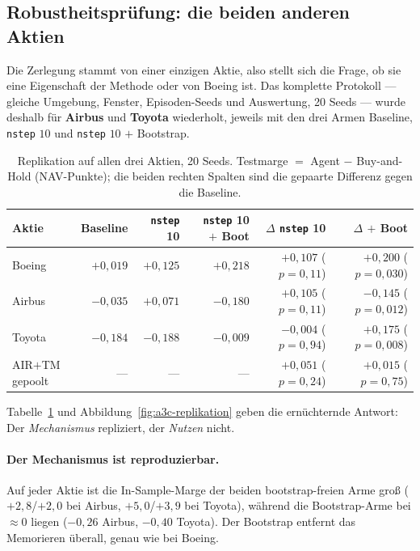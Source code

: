 \subsection{Robustheitsprüfung: die beiden anderen Aktien}
\label{sec:a3c-replikation}

Die Zerlegung stammt von einer einzigen Aktie, also stellt sich die Frage, ob sie eine
Eigenschaft der Methode oder von Boeing ist. Das komplette Protokoll --- gleiche Umgebung,
Fenster, Episoden-Seeds und Auswertung, 20 Seeds --- wurde deshalb für \textbf{Airbus} und
\textbf{Toyota} wiederholt, jeweils mit den drei Armen Baseline, \texttt{nstep} $10$ und
\texttt{nstep} $10$ $+$ Bootstrap.

\begin{table}[H]
  \centering
  \caption{Replikation auf allen drei Aktien, 20 Seeds. Testmarge $=$ Agent $-$ Buy-and-Hold
           (NAV-Punkte); die beiden rechten Spalten sind die gepaarte Differenz gegen die
           Baseline.}
  \label{tab:a3c-replikation}
  \small
  \begin{tabular}{lrrrrr}
    \toprule
    Aktie & Baseline & \texttt{nstep} 10 & \texttt{nstep} 10 $+$ Boot & $\Delta$ \texttt{nstep} 10 & $\Delta$ $+$ Boot\\
    \midrule
    Boeing & $+0{,}019$ & $+0{,}125$ & $+0{,}218$ & $+0{,}107$ ($p=0{,}11$)  & $+0{,}200$ ($p=0{,}030$)\\
    Airbus & $-0{,}035$ & $+0{,}071$ & $-0{,}180$ & $+0{,}105$ ($p=0{,}11$)  & $-0{,}145$ ($p=0{,}012$)\\
    Toyota & $-0{,}184$ & $-0{,}188$ & $-0{,}009$ & $-0{,}004$ ($p=0{,}94$)  & $+0{,}175$ ($p=0{,}008$)\\
    \midrule
    AIR$+$TM gepoolt & --- & --- & --- & $+0{,}051$ ($p=0{,}24$) & $+0{,}015$ ($p=0{,}75$)\\
    \bottomrule
  \end{tabular}
\end{table}

Tabelle~\ref{tab:a3c-replikation} und Abbildung~\ref{fig:a3c-replikation} geben die
ernüchternde Antwort: Der \emph{Mechanismus} repliziert, der \emph{Nutzen} nicht.

\paragraph{Der Mechanismus ist reproduzierbar.} Auf jeder Aktie ist die In-Sample-Marge der
beiden bootstrap-freien Arme groß ($+2{,}8$/$+2{,}0$ bei Airbus, $+5{,}0$/$+3{,}9$ bei
Toyota), während die Bootstrap-Arme bei $\approx 0$ liegen ($-0{,}26$ Airbus, $-0{,}40$
Toyota). Der Bootstrap entfernt das Memorieren überall, genau wie bei Boeing.

